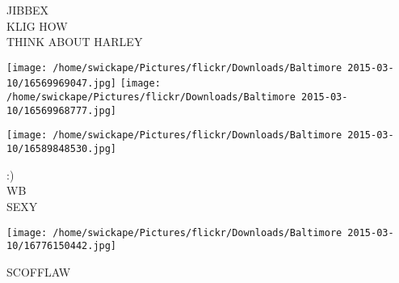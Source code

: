 \documentclass[10pt,letterpaper]{article}
\begin{document}
JIBBEX\\
KLIG HOW\\
THINK ABOUT HARLEY\\
\pagebreak

\texttt{[image: /home/swickape/Pictures/flickr/Downloads/Baltimore 2015-03-10/16569969047.jpg]}
\texttt{[image: /home/swickape/Pictures/flickr/Downloads/Baltimore 2015-03-10/16569968777.jpg]}

\texttt{[image: /home/swickape/Pictures/flickr/Downloads/Baltimore 2015-03-10/16589848530.jpg]}

:)\\
WB\\
SEXY\\
\pagebreak

\texttt{[image: /home/swickape/Pictures/flickr/Downloads/Baltimore 2015-03-10/16776150442.jpg]}

SCOFFLAW\\
\pagebreak
\end{document}
